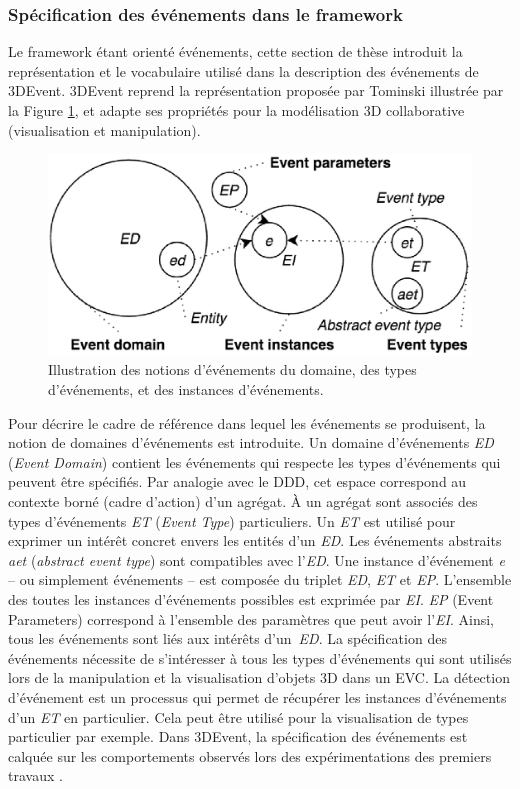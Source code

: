 \subsubsection{Spécification des événements dans le framework}
Le framework étant orienté événements, cette section de thèse introduit la 
représentation et 
le vocabulaire utilisé dans la description des événements de 3DEvent. 3DEvent 
reprend la représentation proposée par Tominski \cite{Doktor-ingenieur2006} 
illustrée par la Figure \ref{fig:representation_event}, et adapte ses propriétés pour 
la modélisation 3D collaborative (visualisation et manipulation). 

\begin{figure}[ht]
	\centering
	\includegraphics[width=0.7\columnwidth]{eps/event4.eps}
	\caption{Illustration des notions d'événements du domaine, des types 
		d'événements, et des instances d'événements.}
	\label{fig:representation_event}
\end{figure} 

Pour décrire le cadre de référence dans lequel les événements se produisent, la 
notion de domaines d'événements est introduite. Un domaine d'événements 
\textit{ED} (\textit{Event Domain}) contient les événements qui respecte les types 
d'événements qui peuvent être spécifiés. Par analogie avec le \gls{DDD}, cet 
espace correspond au contexte borné (cadre d'action) d'un agrégat. À un agrégat 
sont associés des types d'événements \textit{ET} (\textit{Event Type}) particuliers. 
Un \textit{ET} est utilisé pour exprimer un intérêt concret envers les entités d'un 
\textit{ED}. 
Les événements abstraits \textit{aet} (\textit{abstract event type}) sont 
compatibles avec l'\textit{ED}. 
Une instance d'événement \textit{e} -- ou simplement 
événements -- est composée du triplet \textit{ED}, \textit{ET} et \textit{EP}. 
L'ensemble des toutes les instances d'événements possibles est exprimée par 
\textit{EI}. \textit{EP} (Event Parameters) correspond à l'ensemble des paramètres 
que peut avoir l'\textit{EI}. Ainsi, tous les événements sont liés aux intérêts 
d'un~\textit{ED}. La spécification des événements nécessite de 
s'intéresser à tous les types d'événements qui sont utilisés lors de la manipulation 
et la visualisation d'objets 3D dans un \gls{EVC}. La détection d'événement est un 
processus qui permet de récupérer les instances d'événements d'un \textit{ET} en 
particulier. Cela peut être utilisé pour la visualisation de types particulier par 
exemple. Dans 3DEvent, la spécification des événements est calquée sur les 
comportements observés lors des expérimentations des premiers travaux 
\cite{Desprat2015a, Desprat2015b}. 

